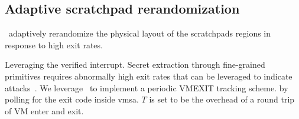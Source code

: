 \subsection{Adaptive scratchpad rerandomization}
\thename\ adaptively rerandomize the physical layout of the scratchpads regions in response to high exit rates.

Leveraging the verified interrupt.
Secret extraction through fine-grained primitives requires abnormally high exit rates that can be leveraged to indicate attacks~\cite{oleksenko2018varys,zhang2020klotski}.
We leverage \veriint\ to implement a periodic VMEXIT tracking scheme.
by polling for the exit code inside \gls{vmsa}.
$T$ is set to be the overhead of a round trip of VM enter and exit.





